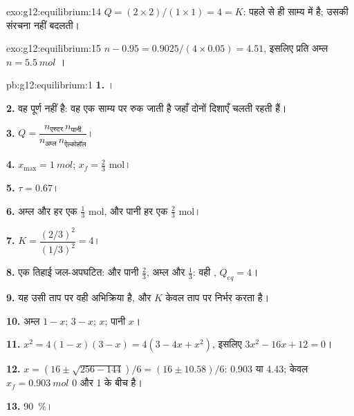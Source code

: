 \begin{solution}{exo:g12:equilibrium:14}
$Q = (2 \times 2)/(1 \times 1) = 4 = K$:  पहले से ही
साम्य में है; उसकी संरचना नहीं बदलती।
\end{solution}

\begin{solution}{exo:g12:equilibrium:15}
$n - 0.95 = 0.9025 / (4 \times 0.05) = 4.51$, इसलिए प्रति  अम्ल
$n = \qty{5.5}{mol}$ ।
\end{solution}

\begin{solution}{pb:g12:equilibrium:1}
\textbf{1.} ।

\textbf{2.} वह पूर्ण नहीं है: वह एक साम्य पर रुक जाती है जहाँ दोनों
दिशाएँ चलती रहती हैं।

\textbf{3.} $Q = \dfrac{n_{\text{एस्टर}}\, n_{\text{पानी}}}{n_{\text{अम्ल}}\, n_{\text{ऐल्कोहॉल}}}$।

\textbf{4.} $x_{\max} = \qty{1}{mol}$; $x_f = \frac{2}{3}$ mol।

\textbf{5.} $\tau = 0.67$।

\textbf{6.} अम्ल और  हर एक $\frac{1}{3}$ mol,  और पानी हर एक
$\frac{2}{3}$ mol।

\textbf{7.} $K = \dfrac{(2/3)^2}{(1/3)^2} = 4$।

\textbf{8.} एक तिहाई जल-अपघटित:  और पानी $\frac{2}{3}$, अम्ल
और  $\frac{1}{3}$: वही , $Q_{eq} = 4$।

\textbf{9.} यह उसी ताप पर वही अभिक्रिया है, और $K$
केवल ताप पर निर्भर करता है।

\textbf{10.} अम्ल $1 - x$;  $3 - x$;  $x$; पानी $x$।

\textbf{11.} $x^2 = 4(1 - x)(3 - x) = 4(3 - 4x + x^2)$, इसलिए
$3x^2 - 16x + 12 = 0$।

\textbf{12.} $x = (16 \pm \sqrt{256 - 144})/6 = (16 \pm 10.58)/6$: 0.903
या 4.43; केवल $x_f = \qty{0.903}{mol}$ 0 और 1 के बीच है।

\textbf{13.} \qty{90}{\percent}।


\end{solution}
